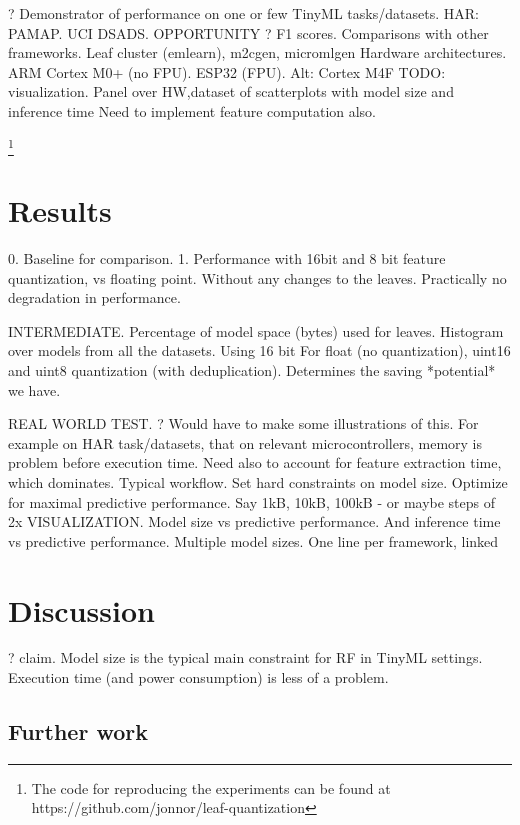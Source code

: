 \documentclass{article}
\begin{document}
? Demonstrator of performance on one or few TinyML tasks/datasets.
HAR: PAMAP. UCI DSADS. OPPORTUNITY ? F1 scores. 
Comparisons with other frameworks. Leaf cluster (emlearn), m2cgen, micromlgen
Hardware architectures. ARM Cortex M0+ (no FPU). ESP32 (FPU). Alt: Cortex M4F
TODO: visualization. Panel over HW,dataset of scatterplots with model size and inference time
Need to implement feature computation also.

\footnote{The code for reproducing the experiments can be found at https://github.com/jonnor/leaf-quantization}

\newpage
\section{Results}

0. Baseline for comparison.
1. Performance with 16bit and 8 bit feature quantization, vs floating point.
Without any changes to the leaves.
Practically no degradation in performance.

INTERMEDIATE. Percentage of model space (bytes) used for leaves.
Histogram over models from all the datasets. Using 16 bit 
For float (no quantization), uint16 and uint8 quantization (with deduplication).
Determines the saving *potential* we have.



REAL WORLD TEST.
? Would have to make some illustrations of this.
For example on HAR task/datasets, that on relevant microcontrollers, memory is problem before execution time. Need also to account for feature extraction time, which dominates.
Typical workflow. Set hard constraints on model size. Optimize for maximal predictive performance. Say 1kB, 10kB, 100kB - or maybe steps of 2x
VISUALIZATION. Model size vs predictive performance. And inference time vs predictive performance. Multiple model sizes. One line per framework, linked 



\section{Discussion}

? claim. Model size is the typical main constraint for RF in TinyML settings.
Execution time (and power consumption) is less of a problem.

\subsection{Further work}
\end{document}
